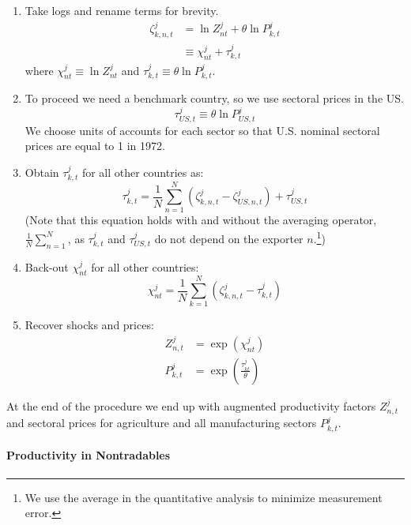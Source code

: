 \documentclass{article}
\begin{document}
\begin{enumerate}
\item Take logs and rename terms for brevity. 
\begin{align}
\zeta _{k,n,t}^{j}& =\ln {Z_{nt}^{j}}+\theta \ln {P_{k,t}^{j}} \\
& \equiv \chi _{nt}^{j}+\tau _{k,t}^{j}
\end{align}%
where $\chi _{nt}^{j}\equiv \ln {Z_{nt}^{j}}$ and $\tau _{k,t}^{j}\equiv
\theta \ln {P_{k,t}^{j}}$.

\item To proceed we need a benchmark country, so we use sectoral prices in
the US. 
\begin{equation*}
\tau _{US,t}^{j}\equiv \theta \ln {P_{US,t}^{j}} 
\end{equation*}%
We choose units of accounts for each sector so that U.S. nominal sectoral
prices are equal to 1 in 1972.

\item Obtain $\tau _{k,t}^{j}$ for all other countries as: 
\begin{equation}
\tau _{k,t}^{j}=\frac{1}{N}\sum_{n=1}^{N}\left( \zeta _{k,n,t}^{j}-\zeta
_{US,n,t}^{j}\right) +\tau _{US,t}^{j}
\end{equation}%
(Note that this equation holds with and without the averaging operator, $%
\frac{1}{N}\sum_{n=1}^{N}$, as $\tau _{k,t}^{j}$ and $\tau _{US,t}^{j}$ do
not depend on the exporter $n$.\footnote{%
We use the average in the quantitative analysis to minimize measurement
error.})

\item Back-out $\chi _{nt}^{j}$ for all other countries:%
\begin{equation}
\chi _{nt}^{j}=\frac{1}{N}\sum_{k=1}^{N}\left( \zeta _{k,n,t}^{j}-\tau
_{k,t}^{j}\right)
\end{equation}

\item Recover shocks and prices:%
\begin{align}
Z_{n,t}^{j}& =\exp \left( \chi _{nt}^{j}\right) \\
P_{k,t}^{j}& =\exp \left( \frac{\tau _{kt}^{j}}{\theta }\right)
\end{align}
\end{enumerate}

At the end of the procedure we end up with augmented productivity factors $%
Z_{n,t}^{j}$ and sectoral prices for agriculture and all manufacturing
sectors $P_{k,t}^{j}$.

\paragraph{Productivity in Nontradables}
\end{document}
